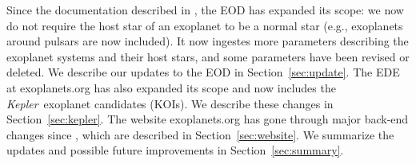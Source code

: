\documentclass[11pt,preprint]{aastex}
\def\kepler{\textit{Kepler}}
\begin{document}
\begin{CJK*}{UTF8}{gbsn}
Since the documentation described in \cite{Wright2011}, the EOD has expanded its scope: we now do
not require the host star of an exoplanet to be a normal star (e.g.,
exoplanets around pulsars are now included). It now ingestes more
parameters describing the exoplanet systems and their host stars, and some
parameters have been revised or deleted. We describe our updates to the
EOD in Section~\ref{sec:update}. The EDE at exoplanets.org has also
expanded its scope and now includes the \kepler\ exoplanet candidates
(KOIs). We describe these changes in Section~\ref{sec:kepler}. The
website exoplanets.org has gone through major back-end changes since
\cite{Wright2011}, which are described in Section~\ref{sec:website}. We
summarize the updates and possible future improvements in
Section~\ref{sec:summary}. 

\end{CJK*}
\end{document}
